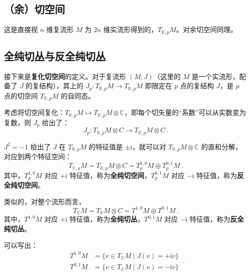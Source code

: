 

\subsection{（余）切空间}
这是直接视 $n$ 维复流形 $M$ 为 $2n$ 维实流形得到的，$T_{\mathbb R, p} M$。对余切空间同理。

\subsection{全纯切丛与反全纯切丛}
接下来是\textbf{复化切空间}的定义。对于复流形 $(M, J)$（这里的 $M$ 是一个实流形，配备了 $J$ 的复结构），其上的 $J_p: T_{\mathbb R,p} M \to T_{\mathbb R, p} M$ 即限定在 $p$ 点的复结构 $J$，是 $p$ 点的切空间 $T_{\mathbb R, p} M$ 的自同态。

考虑将切空间复化：$T_{\mathbb R, p} M \mapsto T_{\mathbb R, p} M \otimes \mathbb C$，即每个切矢量的“系数”可以从实数变为复数，则 $J_p$ 给出了：
\begin{equation}
J_p : T_{\mathbb R,p} M \otimes C \to T_{\mathbb R, p} M \otimes C ~.
\end{equation}

$J^2 = -1$ 给出了 $J$ 在 $T_{\mathbb R, p} M$ 的特征值是 $\pm \mathrm i$，就可以对 $T_{\mathbb R, p} M \otimes \mathbb C$ 的直和分解，对应到两个特征空间：
\begin{equation}
T_{\mathbb C, p} M = T_{\mathbb R, p} M \otimes C = T_p^{1, 0} M \oplus T_p^{0, 1} M ~.
\end{equation}
其中，$T_p^{1, 0} M$ 对应 $+\mathrm i$ 特征值，称为\textbf{全纯切空间}，$T_p^{0, 1} M$ 对应 $-\mathrm i$ 特征值，称为\textbf{反全纯切空间}。


类似的，对整个流形而言，
\begin{equation}
T_{\mathbb C} M = T_\mathbb R M \otimes C = T^{1, 0} M \oplus T^{0, 1} M ~.
\end{equation}
其中，$T^{1, 0} M$ 对应 $+\mathrm i$ 特征值，称为\textbf{全纯切丛}，$T^{0, 1} M$ 对应 $-\mathrm i$ 特征值，称为\textbf{反全纯切丛}。

可以写出：
\begin{equation}
\begin{aligned}
T^{1, 0} M &= \{v \in T_{\mathbb C} M \mid J(v) = +\mathrm i v\} \\
T^{0, 1} M &= \{v \in T_{\mathbb C} M \mid J(v) = -\mathrm i v\} 
\end{aligned} ~.
\end{equation}

